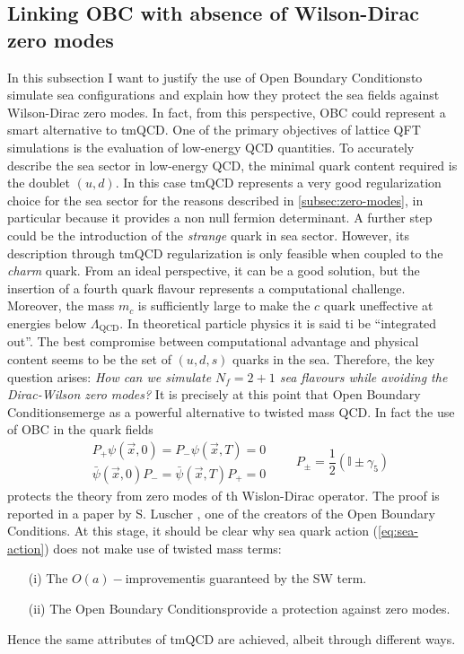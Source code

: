 \documentclass[english, LaM, oneside, noexaminfo]{sapthesis}
\newcommand{\oait}{$O(a)-$improvement}
\newcommand{\obc}{Open Boundary Conditions}
\begin{document}
\subsection{Linking OBC with absence of Wilson-Dirac zero modes}
\noindent
In this subsection I want to justify the use of \obc\space to simulate sea configurations and explain how they protect the sea fields against Wilson-Dirac zero modes.
In fact, from this perspective, OBC could represent a smart alternative to tmQCD.
\newline 
One of the primary objectives of lattice QFT simulations is the evaluation of low-energy QCD quantities.
To accurately describe the sea sector in low-energy QCD, the minimal quark content required is the doublet $(u, d)$.
In this case tmQCD represents a very good regularization choice for the sea sector for the reasons described in \ref{subsec:zero-modes}, in particular because it provides a non null fermion determinant.
\newline
A further step could be the introduction of the {\it strange} quark in sea sector.
However, its description through tmQCD regularization is only feasible when coupled to the {\it charm} quark.
From an ideal perspective, it can be a good solution, but the insertion of a fourth quark flavour represents a computational challenge.
Moreover, the mass $m_c$ is sufficiently large to make the $c$ quark uneffective at energies below $\Lambda_{\text{QCD}}$.
In theoretical particle physics it is said ti be ``integrated out''.
The best compromise between computational advantage and physical content seems to be the set of $(u,d,s)$ quarks in the sea.
\newline
Therefore, the key question arises: \textit{How can we simulate $N_f = 2+1$ sea flavours while avoiding the Dirac-Wilson zero modes?}
It is precisely at this point that \obc\space emerge as a powerful alternative to twisted mass QCD. 
In fact the use of OBC in the quark fields
\begin{equation}\label{eq:obc-on-fermions}
    \begin{aligned}
        & P_+ \psi (\vec x, 0) = P_- \psi (\vec x, T) = 0 \\
        & \bar\psi (\vec x, 0) P_- = \bar\psi (\vec x, T) P_+ = 0 
    \end{aligned}
    \quad\quad P_{\pm} = \frac{1}{2}\left(\mathbb{I} \pm \gamma_5 \right)
\end{equation}
protects the theory from zero modes of th Wislon-Dirac operator.
The proof is reported in a paper by S. Luscher \cite{SF-luscher}, one of the creators of the \obc.
\newline
At this stage, it should be clear why sea quark action (\ref{eq:sea-action}) does not make use of twisted mass terms:
\begin{itemize}
    \item [(i)] The \oait\space is guaranteed by the SW term.
    \item [(ii)] The \obc\space provide a protection against zero modes.
\end{itemize}
Hence the same attributes of tmQCD are achieved, albeit through different ways.
\end{document}
